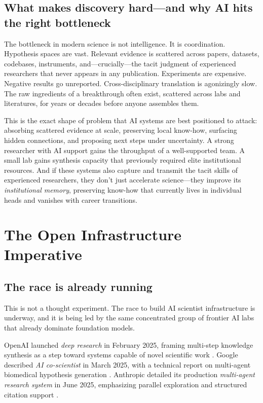 \documentclass[11pt]{article}
\begin{document}
\subsection{What makes discovery hard---and why AI hits the right bottleneck}

The bottleneck in modern science is not intelligence. It is coordination. Hypothesis spaces are vast. Relevant evidence is scattered across papers, datasets, codebases, instruments, and---crucially---the tacit judgment of experienced researchers that never appears in any publication. Experiments are expensive. Negative results go unreported. Cross-disciplinary translation is agonizingly slow. The raw ingredients of a breakthrough often exist, scattered across labs and literatures, for years or decades before anyone assembles them.

This is the exact shape of problem that AI systems are best positioned to attack: absorbing scattered evidence at scale, preserving local know-how, surfacing hidden connections, and proposing next steps under uncertainty. A strong researcher with AI support gains the throughput of a well-supported team. A small lab gains synthesis capacity that previously required elite institutional resources. And if these systems also capture and transmit the tacit skills of experienced researchers, they don't just accelerate science---they improve its \emph{institutional memory}, preserving know-how that currently lives in individual heads and vanishes with career transitions.

\section{The Open Infrastructure Imperative}

\subsection{The race is already running}

This is not a thought experiment. The race to build AI scientist infrastructure is underway, and it is being led by the same concentrated group of frontier AI labs that already dominate foundation models.

OpenAI launched \emph{deep research} in February 2025, framing multi-step knowledge synthesis as a step toward systems capable of novel scientific work \citep{openai2025deepresearch}. Google described \emph{AI co-scientist} in March 2025, with a technical report on multi-agent biomedical hypothesis generation \citep{google2025health,gottweis2025coscientist}. Anthropic detailed its production \emph{multi-agent research system} in June 2025, emphasizing parallel exploration and structured citation support \citep{anthropic2025researchsystem}.
\end{document}
